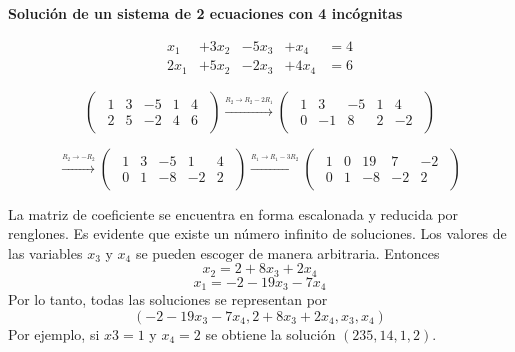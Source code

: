 \documentclass{article}
\begin{document}
\begin{large}
    \textbf{Solución de un sistema de 2 ecuaciones con 4 incógnitas}
\end{large}

\begin{equation*}
    \begin{aligned}
    x_1 &+ 3x_2 &- 5x_3 &+ x_4 &= 4 \\
    2x_1 &+ 5x_2 &- 2x_3 &+ 4x_4 &= 6    
    \end{aligned}
\end{equation*}

\begin{equation*}
    \begin{pmatrix}
        \begin{array}{rrrr|r}
            1 & 3 & -5 & 1 & 4\\
            2 & 5 & -2 & 4 & 6
        \end{array}
    \end{pmatrix}
\xrightarrow{\stackrel{R_2 \rightarrow R_2 - 2R_1}{}}
    \begin{pmatrix}
        \begin{array}{rrrr|r}
            1 & 3 & -5 & 1 & 4\\
            0 & -1 & 8 & 2 & -2
        \end{array}
    \end{pmatrix}
\end{equation*}

\begin{equation*}
    \xrightarrow{\stackrel{R_2 \rightarrow -R_2}{}}
    \begin{pmatrix}
        \begin{array}{rrrr|r}
            1 & 3 & -5 & 1 & 4\\
            0 & 1 & -8 & -2 & 2
        \end{array}
    \end{pmatrix}
\xrightarrow{\stackrel{R_1 \rightarrow R_1 - 3R_2}{}}
    \begin{pmatrix}
        \begin{array}{rrrr|r}
            1 & 0 & 19 & 7 & -2\\
            0 & 1 & -8 & -2 & 2
        \end{array}
    \end{pmatrix}
\end{equation*}

\pagebreak

La matriz de coeficiente se encuentra en forma escalonada y reducida por renglones. Es evidente que existe un número infinito de soluciones. Los valores de las variables $x_3$ y $x_4$ se pueden escoger de manera arbitraria. Entonces $$x_2 = 2 + 8x_3 + 2x_4$$ $$x_1 = -2 -19x_3 -7x_4$$ Por lo tanto, todas las soluciones se representan por $$(-2 -19x_3 -7x_4, 2 + 8x_3 + 2x_4, x_3, x_4)$$ Por ejemplo, si $x3 = 1$ y $x_4 = 2$ se obtiene la solución $(235, 14, 1, 2)$.
\end{document}

